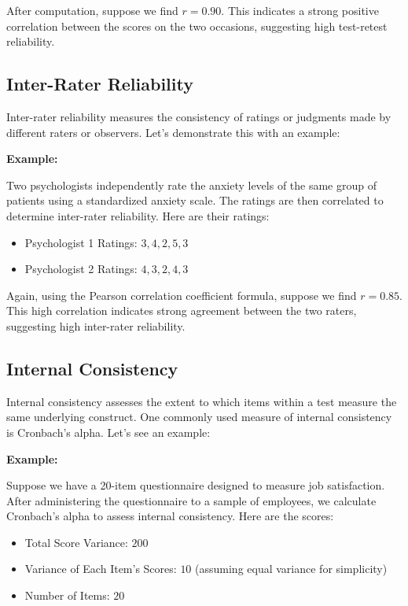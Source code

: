 \documentclass[12pt, a4paper]{exam}
\begin{document}
After computation, suppose we find \(r = 0.90\). This indicates a strong positive correlation between the scores on the two occasions, suggesting high test-retest reliability.

\subsection{Inter-Rater Reliability}

Inter-rater reliability measures the consistency of ratings or judgments made by different raters or observers. Let's demonstrate this with an example:

\textbf{Example:}

Two psychologists independently rate the anxiety levels of the same group of patients using a standardized anxiety scale. The ratings are then correlated to determine inter-rater reliability. Here are their ratings:

\begin{itemize}
    \item Psychologist 1 Ratings: \( 3, 4, 2, 5, 3 \)
    \item Psychologist 2 Ratings: \( 4, 3, 2, 4, 3 \)
\end{itemize}

Again, using the Pearson correlation coefficient formula, suppose we find \(r = 0.85\). This high correlation indicates strong agreement between the two raters, suggesting high inter-rater reliability.

\subsection{Internal Consistency}

Internal consistency assesses the extent to which items within a test measure the same underlying construct. One commonly used measure of internal consistency is Cronbach's alpha. Let's see an example:

\textbf{Example:}

Suppose we have a 20-item questionnaire designed to measure job satisfaction. After administering the questionnaire to a sample of employees, we calculate Cronbach's alpha to assess internal consistency. Here are the scores:

\begin{itemize}
    \item Total Score Variance: \( 200 \)
    \item Variance of Each Item's Scores: \( 10 \) (assuming equal variance for simplicity)
    \item Number of Items: \( 20 \)
\end{itemize}
\end{document}
